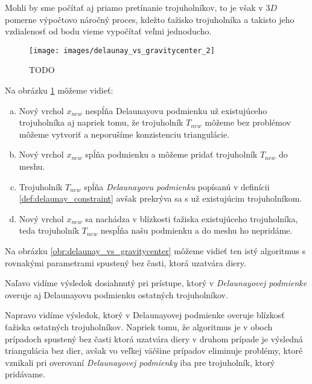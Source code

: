 \begin{enumerate}
{\begin{itemize}
{                Mohli by sme počítať aj priamo pretínanie trojuholníkov, to je však v $3D$ pomerne 
                výpočtovo náročný proces, kdežto ťažisko trojuholníka a takisto jeho vzdialenosť od 
                bodu vieme vypočítať veľmi jednoducho.
            }
         \end{itemize}
         
         \begin{figure}
         \centerline{\texttt{[image: images/delaunay\_vs\_gravitycenter\_2]}}
         \caption[]{TODO}
         \label{obr:delaunay_vs_gravitycenter_2}
         \end{figure}
         
         Na obrázku \ref{obr:delaunay_vs_gravitycenter_2} môžeme vidieť:
         \begin{enumerate}[a)]
            \item{
                Nový vrchol $x_{new}$ nespĺňa Delaunayovu podmienku už existujúceho trojuholníka aj 
                napriek tomu, že trojuholník $T_{new}$ môžeme bez problémov môžeme vytvoriť a 
                neporušíme konzistenciu triangulácie.
            }
            \item{
                Nový vrchol $x_{new}$ spĺňa podmienku a môžeme pridať trojuholník $T_{new}$ do meshu.
            }
            \item{
                Trojuholník $T_{new}$ spĺňa \textit{Delaunayovu podmienku} popísanú v definícii 
                \ref{def:delaunay_constraint} avšak prekrýva sa s už existujúcim trojuholníkom.
            }
            \item{
                Nový vrchol $x_{new}$ sa nachádza v blízkosti ťažiska existujúceho trojuholníka, 
                teda trojuholník $T_{new}$ nespĺňa našu podmienku a do meshu ho nepridáme. 
            }
         \end{enumerate}


         Na obrázku \ref{obr:delaunay_vs_gravitycenter} môžeme vidieť ten 
         istý algoritmus s rovnakými parametrami spustený bez časti, ktorá uzatvára diery. 
         
         Naľavo vidíme výsledok dosiahnutý pri prístupe, ktorý v \textit{Delaunayovej podmienke} overuje aj
         Delaunayovu podmienku ostatných trojuholníkov. 
         
         Napravo vidíme výsledok, ktorý v Delaunayovej
         podmienke overuje blízkosť ťažiska ostatných trojuholníkov. Napriek tomu, že algoritmus
         je v oboch prípadoch spustený bez časti ktorá uzatvára diery v druhom prípade je výsledná 
         triangulácia bez dier, avšak vo veľkej väčšine prípadov eliminuje problémy, ktoré vznikali 
         pri overovaní \textit{Delaunayovej podmienky} iba pre trojuholník, ktorý pridávame.
     }


\end{enumerate}

